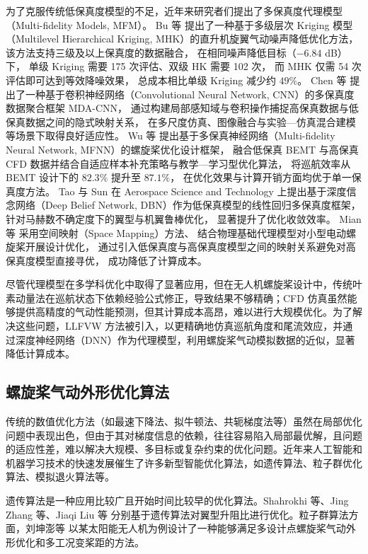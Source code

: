为了克服传统低保真度模型的不足，近年来研究者们提出了多保真度代理模型（Multi-fidelity Models, MFM）。
Bu 等\cite{Bu2022} 提出了一种基于多级层次 Kriging 模型（Multilevel Hierarchical Kriging, MHK）的直升机旋翼气动噪声降低优化方法，
该方法支持三级及以上保真度的数据融合，
在相同噪声降低目标（$-6.84$ dB）下，
单级 Kriging 需要 175 次评估、双级 HK 需要 102 次，
而 MHK 仅需 54 次评估即可达到等效降噪效果，
总成本相比单级 Kriging 减少约 $49\%$。
Chen 等\cite{Chen2022mfm} 提出了一种基于卷积神经网络（Convolutional Neural Network, CNN）的多保真度数据聚合框架 MDA-CNN，
通过构建局部感知域与卷积操作捕捉高保真数据与低保真数据之间的隐式映射关系，
在多尺度仿真、图像融合与实验—仿真混合建模等场景下取得良好适应性。
Wu 等\cite{Wu2024} 提出基于多保真神经网络（Multi-fidelity Neural Network, MFNN）的螺旋桨优化设计框架，
融合低保真 BEMT 与高保真 CFD 数据并结合自适应样本补充策略与教学—学习型优化算法，
将巡航效率从 BEMT 设计下的 $82.3\%$ 提升至 $87.1\%$，
在优化效果与计算开销方面均优于单一保真度方法。
Tao 与 Sun\cite{Tao2019} 在 Aerospace Science and Technology 上提出基于深度信念网络（Deep Belief Network, DBN）作为低保真模型的线性回归多保真度框架，
针对马赫数不确定度下的翼型与机翼鲁棒优化，
显著提升了优化收敛效率。
Mian 等\cite{Mian2021} 采用空间映射（Space Mapping）方法、
结合物理基础代理模型对小型电动螺旋桨开展设计优化，
通过引入低保真度与高保真度模型之间的映射关系避免对高保真度模型直接寻优，
成功降低了计算成本。

尽管代理模型在多学科优化中取得了显著应用，但在无人机螺旋桨设计中，传统叶素动量法在巡航状态下依赖经验公式修正，导致结果不够精确；CFD 仿真虽然能够提供高精度的气动性能预测，但其计算成本高昂，难以进行大规模优化。为了解决这些问题，LLFVW 方法被引入，以更精确地仿真巡航角度和尾流效应，并通过深度神经网络（DNN）作为代理模型，利用螺旋桨气动模拟数据的近似，显著降低计算成本。

\subsection{螺旋桨气动外形优化算法}

传统的数值优化方法（如最速下降法、拟牛顿法、共轭梯度法等）虽然在局部优化问题中表现出色，但由于其对梯度信息的依赖，往往容易陷入局部最优解，且问题的适应性差，难以解决大规模、多目标或复杂约束的优化问题。近年来人工智能和机器学习技术的快速发展催生了许多新型智能优化算法，如遗传算法、粒子群优化算法、模拟退火算法等。

遗传算法是一种应用比较广且开始时间比较早的优化算法。Shahrokhi 等\cite{Shahrokhi2007}、Jing Zhang 等\cite{Zhang2021}、Jiaqi Liu 等\cite{Liu2023} 分别基于遗传算法对翼型升阻比进行优化。粒子群算法方面，刘坤澎等\cite{LiuKP2023} 以某太阳能无人机为例设计了一种能够满足多设计点螺旋桨气动外形优化和多工况变桨距的方法。

